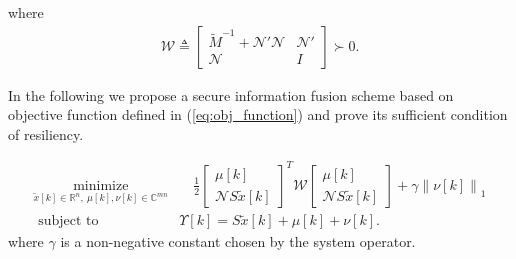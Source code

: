\documentclass[12pt]{article}
\newcommand{\Rb}{{\mathbb{R}}}
\newcommand{\Cb}{{\mathbb{C}}}
\newcommand{\Sc}{{\mathcal{S}}}
\newcommand{\Nc}{{\mathcal{N}}}
\newcommand{\Wc}{{\mathcal{W}}}
\newcommand{\rs}{\text{rowspan}}
\begin{document}
where 
\begin{align}\label{eq:def_W}
\Wc\triangleq \begin{bmatrix}
	\tilde{M}^{-1}+ \Nc{'}\Nc & \Nc{'} \\
	\Nc &  I
\end{bmatrix}\succ 0.
\end{align}



In the following we propose a secure information fusion scheme based on objective function defined in (\ref{eq:obj_function}) and prove its sufficient condition of resiliency.

\begin{subequations}\label{pb:resilient_LASSO}
	\begin{align}
		\underset{{\tilde{x}}[k]\in \Rb^n,\ \mu[k],\nu[k]\in\Cb^{mn}}{\text{minimize}}&\quad \frac{1}{2} 
		\begin{bmatrix}
			\mu[k] \\
			\Nc S \tilde{x}[k]
		\end{bmatrix}^{T} \Wc
		 \begin{bmatrix}
		 	\mu[k] \\
		 	\Nc S \tilde{x}[k]
		 \end{bmatrix} + \gamma\left\|\nu[k]\right\|_1  \\
		\text { subject to }\quad&
		\Upsilon [k]= S \tilde{x}[k]+\mu[k]+\nu[k] .  
	\end{align}
\end{subequations}
where $\gamma$ is a non-negative constant chosen by the system operator.
\end{document}
